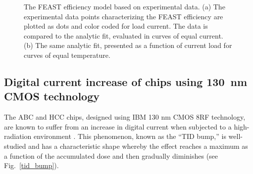 \begin{figure}[ht]
\centering
{}\quad\quad
{}
\caption{The FEAST efficiency model based on experimental data. (a) The experimental data points
characterizing the FEAST efficiency are plotted as dots and color coded for load current. The data is
compared to the analytic fit, evaluated in curves of equal current. (b) The same analytic fit,
presented as a function of current load for curves of equal temperature.
}
\label{fig:feast_eff}
\end{figure}


\subsection{Digital current increase of chips using 130~nm CMOS technology}
\label{sec:tid_explanation}

The ABC and HCC chips, designed using IBM 130 nm CMOS 8RF technology, are known to suffer from an
increase in digital current when subjected to a high-radiation environment
\cite{Collaboration:2017mtb}. This phenomenon, known as the ``TID bump,'' is well-studied
\cite{1589217,FACCIO20081000} and has a characteristic shape whereby the effect reaches a maximum
as a function of the accumulated dose and then gradually diminishes (see Fig.~\ref{tid_bump}).

